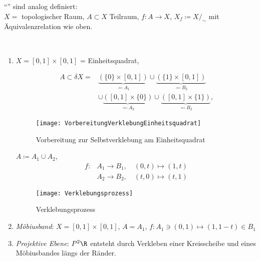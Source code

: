 \begin{remark}[Selbstverklebungen]
  ``''\label{def:selbstverklebung} sind analog definiert: \\
  \( X = \) topologischer Raum, \( A \subset X \) Teilraum, \( f : A \to X \), \( X_f \coloneqq X/_\sim \) mit Äquivalenzrelation wie oben.
\end{remark}

\begin{example}
  \
  \begin{enumerate}
    \item \( X = [0,1] \times [0,1] \) = Einheitsquadrat,

      \begin{minipage}{.45\textwidth}
        \begin{align*}
          A \subset \delta X = &\underbrace{\left( \{ 0 \} \times [0,1] \right)}_{\eqqcolon A_1} \cup \underbrace{\left( \{ 1 \} \times [0,1] \right)}_{\eqqcolon B_2} \\
          &\cup \underbrace{\left( [0,1] \times \{ 0 \} \right)}_{\eqqcolon A_2} \cup \underbrace{\left( [0,1] \times \{ 1 \} \right)}_{\eqqcolon B_2}\text{,}
        \end{align*}
      \end{minipage}
      \hfill
      \begin{minipage}{.45\textwidth}
        \begin{figure}[H]
          \texttt{[image: VorbereitungVerklebungEinheitsquadrat]}
          \caption{Vorbereitung zur Selbstverklebung am Einheitsquadrat}
        \end{figure}
      \end{minipage}

      \( A \coloneqq A_1 \cup A_2 \),
      \begin{align*}
        f: &A_1 \to B_1, \quad (0,t) \mapsto (1,t) \\
         &A_2 \to B_2, \quad (t,0) \mapsto (t,1)
      \end{align*}
      \begin{figure}[H]
        \texttt{[image: Verklebungsprozess]}
        \caption{Verklebungsprozess}
      \end{figure}
    \item \emph{Möbiusband}: \( X = [0,1] \times [0,1] \), \( A = A_1 \), \( f: A_1 \ni (0,1) \mapsto (1,1-t) \in B_1 \)
    \item \emph{Projektive Ebene}: \( P^2\R \) entsteht durch Verkleben einer Kreisscheibe und eines Möbiusbandes längs der Ränder.
  \end{enumerate}
\end{example}
